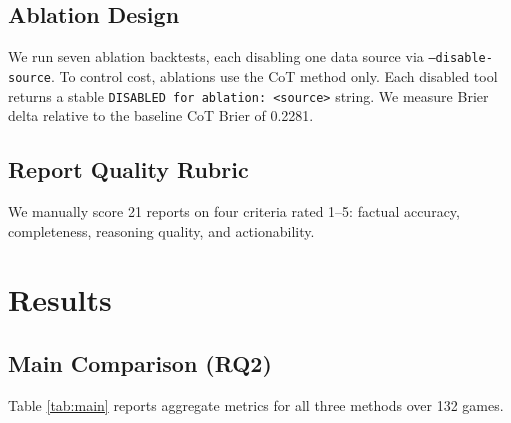 \documentclass[11pt]{article}
\begin{document}
\begin{multicols}{2}
\subsection{Ablation Design}

We run seven ablation backtests, each disabling one data source via \texttt{--disable-source}. To control cost, ablations use the CoT method only. Each disabled tool returns a stable \texttt{DISABLED for ablation: <source>} string. We measure Brier delta relative to the baseline CoT Brier of 0.2281.

\subsection{Report Quality Rubric}

We manually score 21 reports on four criteria rated 1--5: factual accuracy, completeness, reasoning quality, and actionability.

\section{Results}

\subsection{Main Comparison (RQ2)}

Table \ref{tab:main} reports aggregate metrics for all three methods over 132 games.

\begin{table}[H]
\centering
\caption{Main evaluation results. Lower Brier, log loss, and ECE are better. Higher accuracy is better.}
\label{tab:main}
\end{table}


\end{multicols}
\end{document}
